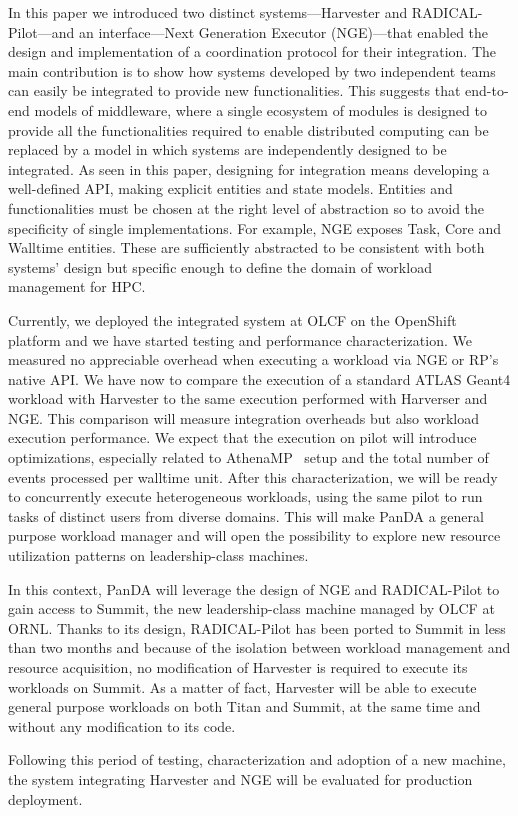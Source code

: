 \documentclass{webofc}
\begin{document}
In this paper we introduced two distinct systems---Harvester and
RADICAL-Pilot---and an interface---Next Generation Executor (NGE)---that
enabled the design and implementation of a coordination protocol for their
integration. The main contribution is to show how systems developed by two
independent teams can easily be integrated to provide new functionalities.
This suggests that end-to-end models of middleware, where a single ecosystem
of modules is designed to provide all the functionalities required to enable
distributed computing can be replaced by a model in which systems are
independently designed to be integrated. As seen in this paper, designing for
integration means developing a well-defined API, making explicit entities and
state models. Entities and functionalities must be chosen at the right level
of abstraction so to avoid the specificity of single implementations. For
example, NGE exposes Task, Core and Walltime entities. These are sufficiently
abstracted to be consistent with both systems’ design but specific enough to
define the domain of workload management for HPC.

Currently, we deployed the integrated system at OLCF on the OpenShift
platform and we have started testing and performance characterization. We
measured no appreciable overhead when executing a workload via NGE or RP's
native API. We have now to compare the execution of a standard ATLAS Geant4
workload with Harvester to the same execution performed with Harverser and
NGE. This comparison will measure integration overheads but also workload
execution performance. We expect that the execution on pilot will introduce
optimizations, especially related to AthenaMP~\cite{Crooks_2012} setup and
the total number of events processed per walltime unit. After this
characterization, we will be ready to concurrently execute heterogeneous
workloads, using the same pilot to run tasks of distinct users from diverse
domains. This will make PanDA a general purpose workload manager and will
open the possibility to explore new resource utilization patterns on
leadership-class machines.

In this context, PanDA will leverage the design of NGE and RADICAL-Pilot to
gain access to Summit, the new leadership-class machine managed by OLCF at
ORNL. Thanks to its design, RADICAL-Pilot has been ported to Summit in less
than two months and because of the isolation between workload management and
resource acquisition, no modification of Harvester is required to execute its
workloads on Summit. As a matter of fact, Harvester will be able to execute
general purpose workloads on both Titan and Summit, at the same time and
without any modification to its code.

Following this period of testing, characterization and adoption of a new
machine, the system integrating Harvester and NGE will be evaluated for
production deployment.



\end{document}
